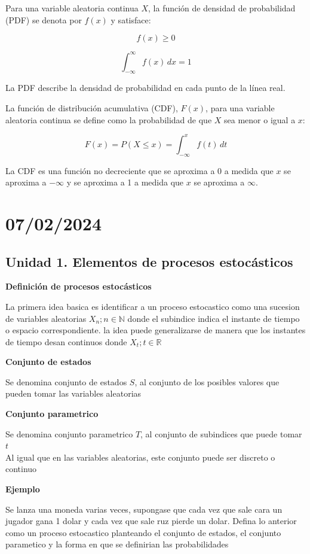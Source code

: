\documentclass{article}
\begin{document}
Para una variable aleatoria continua \(X\), la función de densidad de probabilidad (PDF) se denota por \(f(x)\) y satisface:

\[ f(x) \geq 0 \]

\[ \int_{-\infty}^{\infty} f(x) \, dx = 1 \]

La PDF describe la densidad de probabilidad en cada punto de la línea real.

La función de distribución acumulativa (CDF), \(F(x)\), para una variable aleatoria continua se define como la probabilidad de que \(X\) sea menor o igual a \(x\):

\[ F(x) = P(X \leq x) = \int_{-\infty}^{x} f(t) \, dt \]

La CDF es una función no decreciente que se aproxima a 0 a medida que \(x\) se aproxima a \(-\infty\) y se aproxima a 1 a medida que \(x\) se aproxima a \(\infty\).

\section{07/02/2024}


\subsection{Unidad 1. Elementos de procesos estocásticos}

\textbf{Definición de procesos estocásticos}

La primera idea basica es identificar a un proceso estocastico como una sucesion de variables aleatorias ${X_n; n \in \mathbb{N}}$ donde el subindice indica el instante de tiempo o espacio correspondiente. la idea puede generalizarse de manera que los instantes de tiempo desan continuos donde  ${X_t;t \in \mathbb{R}} $

\textbf{Conjunto de estados}

Se denomina conjunto de estados $S$, al conjunto de los posibles valores que pueden tomar las variables aleatorias


\textbf{Conjunto parametrico}

Se denomina conjunto parametrico $T$, al conjunto de subindices que puede tomar $t$\\
Al igual que en las variables aleatorias, este conjunto puede ser discreto o continuo

\textbf{Ejemplo}

Se lanza una moneda varias veces, supongase que cada vez que sale cara un jugador gana 1 dolar y cada vez que sale ruz pierde un dolar. Defina lo anterior como un proceso estocastico planteando el conjunto de estados, el conjunto parametico y la forma en que se definirian las probabilidades
\end{document}
